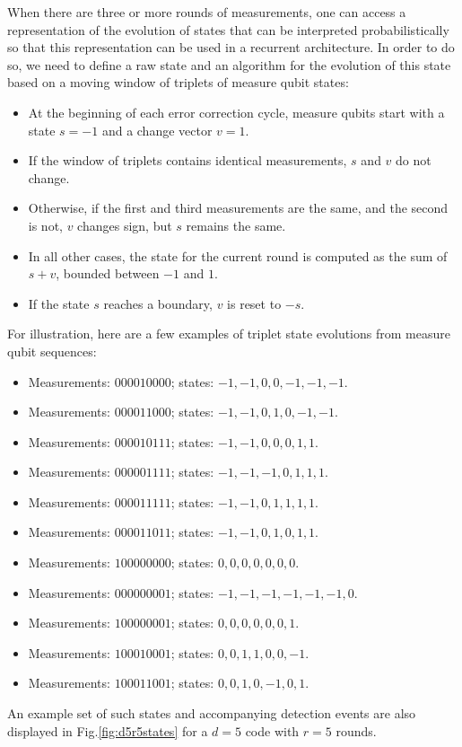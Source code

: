When there are three or more rounds of measurements, one can access a representation of the evolution of states that can be interpreted probabilistically so that this representation can be used in a recurrent architecture. In order to do so, we need to define a raw state and an algorithm for the evolution of this state based on a moving window of triplets of measure qubit states:
\begin{itemize}
\item At the beginning of each error correction cycle, measure qubits start with a state $s=-1$ and a change vector $v=1$.
\item If the window of triplets contains identical measurements, $s$ and $v$ do not change.
\item Otherwise, if the first and third measurements are the same, and the second is not, $v$ changes sign, but $s$ remains the same.
\item In all other cases, the state for the current round is computed as the sum of $s+v$, bounded between $-1$ and $1$.
\item If the state $s$ reaches a boundary, $v$ is reset to $-s$.
\end{itemize}

For illustration, here are a few examples of triplet state evolutions from measure qubit sequences:
\begin{itemize}
\item Measurements: $000010000$; states: $-1,-1,0,0,-1,-1,-1$.
\item Measurements: $000011000$; states: $-1,-1,0,1,0,-1,-1$.
\item Measurements: $000010111$; states: $-1,-1,0,0,0,1,1$.
\item Measurements: $000001111$; states: $-1,-1,-1,0,1,1,1$.
\item Measurements: $000011111$; states: $-1,-1,0,1,1,1,1$.
\item Measurements: $000011011$; states: $-1,-1,0,1,0,1,1$.
\item Measurements: $100000000$; states: $0,0,0,0,0,0,0$.
\item Measurements: $000000001$; states: $-1,-1,-1,-1,-1,-1,0$.
\item Measurements: $100000001$; states: $0,0,0,0,0,0,1$.
\item Measurements: $100010001$; states: $0,0,1,1,0,0,-1$.
\item Measurements: $100011001$; states: $0,0,1,0,-1,0,1$.
\end{itemize}
An example set of such states and accompanying detection events are also displayed in Fig.\ref{fig:d5r5states} for a $d=5$ code with $r=5$ rounds.

